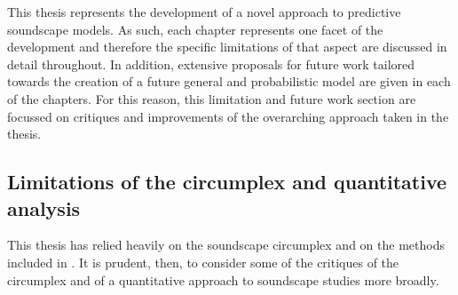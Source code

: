 This thesis represents the development of a novel approach to predictive soundscape models. As such, each chapter represents one facet of the development and therefore the specific limitations of that aspect are discussed in detail throughout. In addition, extensive proposals for future work tailored towards the creation of a future general and probabilistic model are given in each of the chapters.  For this reason, this limitation and future work section are focussed on critiques and improvements of the overarching approach taken in the thesis.

\subsection{Limitations of the circumplex and quantitative analysis}

This thesis has relied heavily on the soundscape circumplex and on the methods included in \cite{ISO12913Part2}. It is prudent, then, to consider some of the critiques of the circumplex and of a quantitative approach to soundscape studies more broadly.

